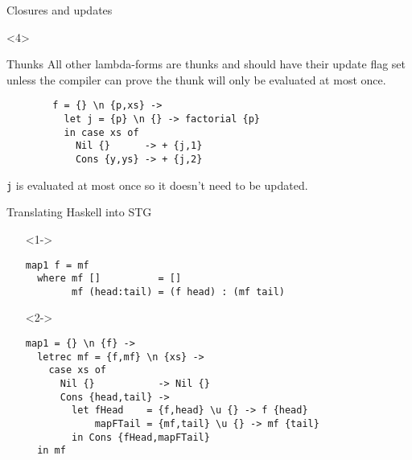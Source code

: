 \documentclass{beamer}
\begin{document}
\begin{frame}[fragile]{Closures and updates}
  \begin{onlyenv}<4>
    \begin{block}{Thunks}
      All other lambda-forms are thunks and should have their update flag set
      unless the compiler can prove the thunk will only be evaluated at most
      once.

      \begin{verbatim}
        f = {} \n {p,xs} ->
          let j = {p} \n {} -> factorial {p}
          in case xs of
            Nil {}      -> + {j,1}
            Cons {y,ys} -> + {j,2}
      \end{verbatim}

      \texttt{j} is evaluated at most once so it doesn't need to be updated.
    \end{block}
  \end{onlyenv}
\end{frame}

\begin{frame}[fragile]{Translating Haskell into STG}
  \begin{itemize}
  \item[]<1-> \begin{verbatim}
map1 f = mf
  where mf []          = []
        mf (head:tail) = (f head) : (mf tail)
    \end{verbatim}
  \item[]<2-> \begin{verbatim}
map1 = {} \n {f} ->
  letrec mf = {f,mf} \n {xs} ->
    case xs of
      Nil {}           -> Nil {}
      Cons {head,tail} ->
        let fHead    = {f,head} \u {} -> f {head}
            mapFTail = {mf,tail} \u {} -> mf {tail}
        in Cons {fHead,mapFTail}
  in mf
    \end{verbatim}
  \end{itemize}
\end{frame}
\end{document}
